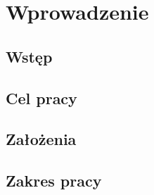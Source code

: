 \chapter{Wprowadzenie}
\label{t:wprowadzenie}


	\section{Wstęp}
	\label{t:wprowadzenie:stan}

		
		
	\section{Cel pracy}
	\label{t:wprowadzenie:cel}
	
	\section{Założenia}
	\label{t:wprowadzenie:zalozenia}
	
	\section{Zakres pracy}
	\label{t:wprowadzenie:zakres}
	